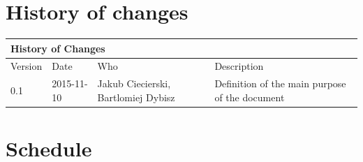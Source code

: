 \documentclass{article}
\begin{document}
\section*{History of changes}

\begin{center}


\begin{table}[h]
\hspace*{-1.0cm}
\large
\begin{tabular}{|l|l|l|l|}
\hline
\multicolumn{4}{|l|}{\cellcolor[HTML]{C0C0C0}History of Changes} \\ \hline
Version         & Date         & Who        & Description        \\ \hline

0.1         
& 2015-11-10
& Jakub Ciecierski, Bartlomiej Dybisz
& Definition of the main purpose of the document       \\ \hline
\end{tabular}
\end{table}

\end{center}



\section*{Schedule}
\end{document}
